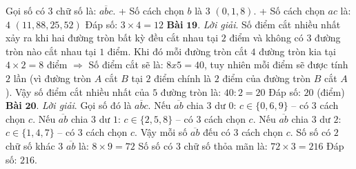 \begin{multicols}{2}
	Gọi số có $3$ chữ số là: $\overline{abc}$.
	\vskip 0.1cm
	+ Số cách chọn $b$ là $3$ $(0,1,8)$.
	\vskip 0.1cm
	+ Số cách chọn $ac$ là: $4$ $(11, 88,25, 52)$
	\vskip 0.1cm
	Đáp số: $3\times 4=12$
	\vskip 0.1cm
	\textbf{\color{cackithi}Bài} $\pmb{19.}$ \textit{Lời giải}. Số điểm cắt nhiều nhất xảy ra khi hai đường tròn bất kỳ đều cắt nhau tại $2$ điểm và không có $3$ đường tròn nào cắt nhau tại $1$ điểm. Khi đó mỗi đường tròn cắt $4$ đường tròn kia tại $4\times 2=8$ điểm $\Rightarrow$ Số điểm cắt sẽ là: $8x5 = 40$, tuy nhiên mỗi điểm sẽ được tính $2$ lần (vì đường tròn $A$ cắt $B$ tại $2$ điểm chính là $2$ điểm của đường tròn $B$ cắt $A$). Vậy số điểm cắt nhiều nhất của $5$ đường tròn là: $40:2 = 20$
	\vskip 0.1cm
	Đáp số: $20$ (điểm)
	\vskip 0.1cm
	\textbf{\color{cackithi}Bài} $\pmb{20.}$ \textit{Lời giải}. 
	Gọi số đó là $\overline{abc}$.
	\vskip 0.1cm
	Nếu $\overline{ab}$ chia $3$ dư $0$: $c\in \{0,6,9\}$ -- có $3$ cách chọn $c$.
	\vskip 0.1cm  
	Nếu $\overline{ab}$ chia $3$ dư $1$: $c\in \{2,5,8\}$ -- có $3$ cách chọn $c$.
	\vskip 0.1cm  
	Nếu $\overline{ab}$ chia $3$ dư $2$: $c\in \{1,4,7\}$ -- có $3$ cách chọn $c$.
	\vskip 0.1cm  
	Vậy mỗi số $\overline{ab}$ đếu có $3$ cách chọn $c$. Số số có $2$ chữ số khác $3$ $\overline{ab}$ là: $8\times9=72$
	\vskip 0.1cm
	Số số có $3$ chữ số thỏa mãn là: $72\times 3=216$
	\vskip 0.1cm
	Đáp số: $216$. 
\end{multicols}
\newpage
\begingroup
{}

